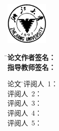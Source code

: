 
\newpage
\thispagestyle{empty}

\vspace{5mm}

\begin{center}
\xunderline[115mm]{\linespread{1.1}\xiaoer\Fangsong\bfseries\centerline\zjutitlec}
\ifthenelse{\equal\zjutitlecb{}}{}{\\[2mm]\xunderline[115mm]{\linespread{1.1}\xiaoer\Fangsong\bfseries\centerline\zjutitlecb}}
\ifthenelse{\equal\zjutitlecc{}}{}{\\[2mm]\xunderline[115mm]{\linespread{1.1}\xiaoer\Fangsong\bfseries\centerline\zjutitlecc}}
\end{center}

\vspace{5mm}

\begin{center}
  \includegraphics[width=21mm]{images/standxb.png}
\end{center}

\vspace{3mm}

\begin{tabbing}
\hspace{30mm} \= \Songti\xiaosan\bfseries 论文作者签名： \= \underline{\makebox[5cm]{}} \\[8mm]
              \> \Songti\xiaosan\bfseries 指导教师签名： \> \underline{\makebox[5cm]{}}
\end{tabbing}

\vspace{8mm}

\begin{tabbing}
\hspace{10mm} \Songti\sihao 论文 \hspace{-2.6mm} \= \Songti\sihao 评阅人~1： \= \underline{\makebox[9cm]{\sihao\zjurevieweronec}} \\
              \> \Songti\sihao 评阅人~2： \> \underline{\makebox[9cm]{\sihao\zjureviewertwoc}} \\
              \> \Songti\sihao 评阅人~3： \> \underline{\makebox[9cm]{\sihao\zjureviewerthreec}} \\
              \> \Songti\sihao 评阅人~4： \> \underline{\makebox[9cm]{\sihao\zjureviewerfourc}} \\
              \> \Songti\sihao 评阅人~5： \> \underline{\makebox[9cm]{\sihao\zjureviewerfivec}}
\end{tabbing}

